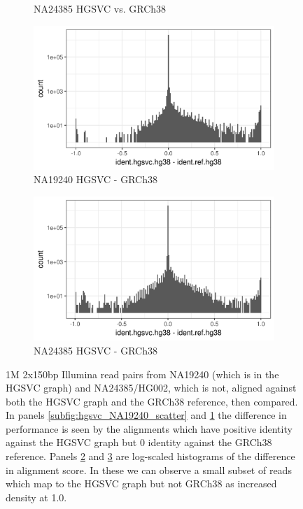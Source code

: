 \documentclass[a4paper,12pt,numbered,oneside]{Classes/PhDThesisPSnPDF}
\begin{document}
\begin{figure}[htbp!]
\begin{subfigure}[t]{0.49\textwidth}
    \caption{NA24385 HGSVC vs. GRCh38}
    \label{subfig:hgsvc_NA24385_scatter}
  \end{subfigure}
  \begin{subfigure}[t]{0.49\textwidth}
    \includegraphics[width=1.0\textwidth]{Chapter3/Figs/NA19240_hg38_vs_HGSVC_hist.png}
    \caption{NA19240 HGSVC - GRCh38}
    \label{subfig:hgsvc_NA19240_hist}
  \end{subfigure}
  \begin{subfigure}[t]{0.49\textwidth}
    \includegraphics[width=1.0\textwidth]{Chapter3/Figs/NA24385_hg38_vs_HGSVC_hist.png}
    \caption{NA24385 HGSVC - GRCh38}
    \label{subfig:hgsvc_NA24385_hist}
  \end{subfigure}
  \caption[Alignment against the HGSVC graph]{
    1M 2x150bp Illumina read pairs from NA19240 (which is in the HGSVC graph) and NA24385/HG002, which is not, aligned against both the HGSVC graph and the GRCh38 reference, then compared.
    In panels \ref{subfig:hgsvc_NA19240_scatter} and \ref{subfig:hgsvc_NA24385_scatter} the difference in performance is seen by the alignments which have positive identity against the HGSVC graph but 0 identity against the GRCh38 reference.
    Panels \ref{subfig:hgsvc_NA19240_hist} and \ref{subfig:hgsvc_NA24385_hist} are log-scaled histograms of the difference in alignment score.
    In these we can observe a small subset of reads which map to the HGSVC graph but not GRCh38 as increased density at 1.0.
   }
\label{fig:hgsvc_alignment}
\end{figure}
\end{document}
